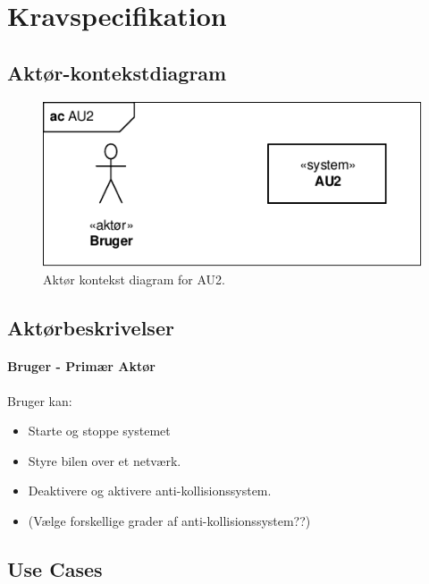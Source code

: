 \chapter{Kravspecifikation}
\section{Aktør-kontekstdiagram}

\begin{figure}[h]
\centering
\includegraphics[width=\textwidth - 3 cm]{../fig/diagrammer/ac_au2.pdf}
\caption{Aktør kontekst diagram for AU2.}
\label{fig:aktor_kontekst}
\end{figure}


\section{Aktørbeskrivelser}
\subsubsection{Bruger - Primær Aktør}
Bruger kan:
\begin{itemize}
\item Starte og stoppe systemet 
\item Styre bilen over et netværk.
\item Deaktivere og aktivere anti-kollisionssystem.
\item (Vælge forskellige grader af anti-kollisionssystem??)
\end{itemize}
\clearpage

\section{Use Cases}

